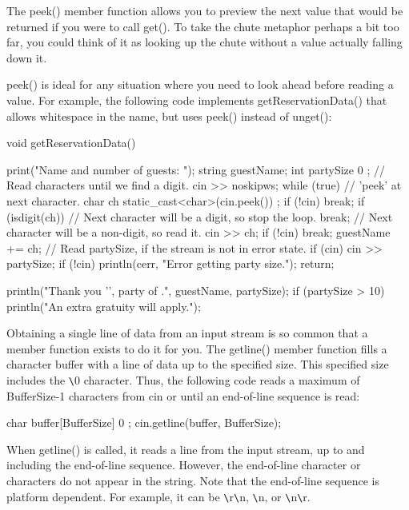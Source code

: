 
The peek() member function allows you to preview the next value that would be returned if you were to call get(). To take the chute metaphor perhaps a bit too far, you could think of it as looking up the chute without a value actually falling down it.

peek() is ideal for any situation where you need to look ahead before reading a value. For example, the following code implements getReservationData() that allows whitespace in the name, but uses peek() instead of unget():

\begin{cpp}
void getReservationData()
{
    print("Name and number of guests: ");
    string guestName;
    int partySize { 0 };
    // Read characters until we find a digit.
    cin >> noskipws;
    while (true) {
        // 'peek' at next character.
        char ch { static_cast<char>(cin.peek()) };
        if (!cin) { break; }
        if (isdigit(ch)) {
            // Next character will be a digit, so stop the loop.
            break;
        }
        // Next character will be a non-digit, so read it.
        cin >> ch;
        if (!cin) { break; }
        guestName += ch;
    }
    // Read partySize, if the stream is not in error state.
    if (cin) { cin >> partySize; }
    if (!cin) {
        println(cerr, "Error getting party size.");
        return;
    }

    println("Thank you '{}', party of {}.", guestName, partySize);
    if (partySize > 10) {
        println("An extra gratuity will apply.");
    }
}
\end{cpp}


Obtaining a single line of data from an input stream is so common that a member function exists to do it for you. The getline() member function fills a character buffer with a line of data up to the specified size. This specified size includes the \verb|\|0 character. Thus, the following code reads a maximum of BufferSize-1 characters from cin or until an end-of-line sequence is read:

\begin{cpp}
char buffer[BufferSize] { 0 };
cin.getline(buffer, BufferSize);
\end{cpp}

When getline() is called, it reads a line from the input stream, up to and including the end-of-line sequence. However, the end-of-line character or characters do not appear in the string. Note that the end-of-line sequence is platform dependent. For example, it can be \verb|\|r\verb|\|n, \verb|\|n, or \verb|\|n\verb|\|r.

